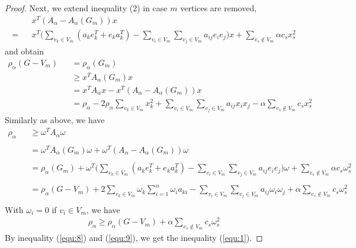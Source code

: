 \documentclass[amsthm]{elsart}
\begin{document}
\begin{proof}
\qquad Next, we extend inequality (2) in case $m$ vertices are removed,
\begin{eqnarray*}
  &&x^T(A_\alpha - A_\alpha(G_m))x
\\ = &&x^T \Big(\sum \limits_{v_k \in V_m}^{} (a_k e_k^T + e_k a_k^T)
- \sum \limits_{v_i \in V_m}^{} \sum \limits_{v_j \in V_m}^{} a_{ij} e_i e_j \Big) x
+ \sum \limits_{v_s \notin V_m}^{} \alpha c_s x_s^2
\end{eqnarray*}
and obtain \\
\begin{eqnarray}
\nonumber \rho_\alpha(G - V_m)
&&= \rho_\alpha(G_m)
\\ \nonumber &&\geqslant x^T A_\alpha(G_m) x
\\ \nonumber &&= x^T A_\alpha x - x^T(A_\alpha - A_\alpha(G_m))x
\\ \label{equ:8} &&= \rho_\alpha
   - 2 \rho_\alpha \sum \limits_{v_k \in V_m}^{} x_k^2
   + \sum \limits_{v_i \in V_m}^{} \sum \limits_{v_j \in V_m}^{} a_{ij} x_i x_j
   - \alpha \sum \limits_{v_s \notin V_m}^{} c_s x_s^2
\end{eqnarray}
Similarly as above, we have
\begin{eqnarray*}
\rho_\alpha
&&\geqslant \omega ^T A_\alpha \omega \\
\\ &&= \omega ^T A_\alpha(G_m) \omega + \omega^T (A_\alpha - A_\alpha(G_m)) \omega \\
\\ &&= \rho_\alpha(G_m) + \omega^T \Big(\sum \limits_{v_k \in V_m}^{} (a_k e_k^T + e_k a_k^T)
  - \sum \limits_{v_i \in V_m}^{} \sum \limits_{v_j \in V_m}^{} a_{ij} e_i e_j \Big) \omega
  + \sum \limits_{v_s \notin V_m}^{} \alpha c_s \omega_s^2 \\
\\ &&= \rho_\alpha(G - V_m)
  + 2 \sum \limits_{v_k \in V_m}^{} \omega_k \sum \limits_{i=1}^{n}\omega_i a_{ki}
  - \sum \limits_{v_i \in V_m}^{} \sum \limits_{v_j \in V_m}^{} a_{ij} \omega_i \omega_j
  + \alpha \sum \limits_{v_s \notin V_m}^{} c_s \omega_s^2 \\
\end{eqnarray*}
With $\omega_i = 0$ if $v_i \in V_m$, we have 
\begin{eqnarray} \label{equ:9}
\rho_\alpha
\geqslant \rho_\alpha(G - V_m) + \alpha \sum \limits_{v_s \notin V_m}^{} c_s \omega_s^2 
\end{eqnarray}
By inequality (\ref{equ:8}) and (\ref{equ:9}), we get the inequality (\ref{equ:1}).
\end{proof}
\end{document}
